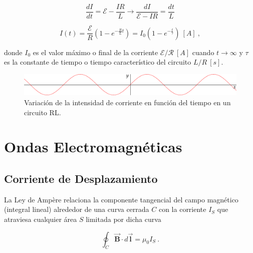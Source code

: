 \documentclass{tufte-handout}
\begin{document}
\begin{equation}
\displaystyle\frac{dI}{dt} = \mathcal{E} - \displaystyle\frac{IR}{L} \rightarrow \displaystyle\frac{dI}{\mathcal{E}-IR} = \displaystyle\frac{dt}{L}
\end{equation}


\begin{equation}
I(t) = \displaystyle\frac{\mathcal{E}}{R}(1 - e^{-\displaystyle\frac{R}{L}t}) = I_0 (1 - e^{-\displaystyle\frac{t}{\tau}})~[A]~,
\end{equation}

donde $I_0$ es el valor máximo o final de la corriente $\mathcal{E/R}~[A]$ cuando $t\rightarrow \infty$ y $\tau$ es la constante de tiempo o tiempo característico del circuito $L/R~[s]$.

\begin{figure}[h]
    \includegraphics[width=\linewidth]{sine.pdf}%
    \caption{Variación de la intensidad de corriente en función del tiempo en un circuito RL.}%
    \label{fig:fullfig}%
  \end{figure}


\clearpage

\section{Ondas Electromagnéticas}

\subsection{Corriente de Desplazamiento}

La Ley de Ampère relaciona la componente tangencial del campo magnético (integral lineal) alrededor de una curva cerrada $C$ con la corriente $I_S$ que atraviesa cualquier área $S$ limitada por dicha curva

\begin{equation}
\oint_C \mathbf{\vec{B}}\cdot d\mathbf{\vec{l}} = \mu_0 I_S~.
\end{equation}
\end{document}

